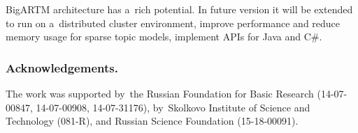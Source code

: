 \documentclass{sig-alternate-2013}
\begin{document}
\mbox{BigARTM} architecture has a~rich potential.
In future version it will be extended to run on a~distributed cluster environment,
improve performance and reduce memory usage for sparse topic models,
implement APIs for Java and C\#.

\bigskip
\subsubsection*{Acknowledgements.}
\nopagebreak
The work was supported by~the Russian Foundation for Basic Research (14-07-00847, 14-07-00908, 14-07-31176),
by~Skolkovo Institute of Science and Technology (081-R), and
Russian Science Foundation (15-18-00091).


%
%
\end{document}
